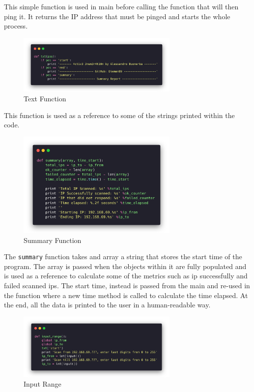 This simple function is used in main before calling the function that will then
ping it. It returns the IP address that must be pinged and starts the whole
process.

\begin{figure}[H]
  \centering
  \includegraphics[width=0.7\textwidth]{figures/code/txt}
  \caption{Text Function}
  \label{f:txt}
\end{figure}

This function is used as a reference to some of the strings printed within the code.

\begin{figure}[H]
  \centering
  \includegraphics[width=0.7\textwidth]{figures/code/summary}
  \caption{Summary Function}
  \label{f:summary}
\end{figure}

The \lstinline{summary} function takes and array a string that stores the start
time of the program. The array is passed when the objects within it are fully
populated and is used as a reference to calculate some of the metrics such as ip
successfully and failed scanned ips. The start time, instead is passed from the
main and re-used in the function where a new time method is called to calculate
the time elapsed. At the end, all the data is printed to the user in a
human-readable way.

\begin{figure}[H]
  \centering
  \includegraphics[width=0.7\textwidth]{figures/code/input-range}
  \caption{Input Range}
  \label{f:input-range}
\end{figure}


